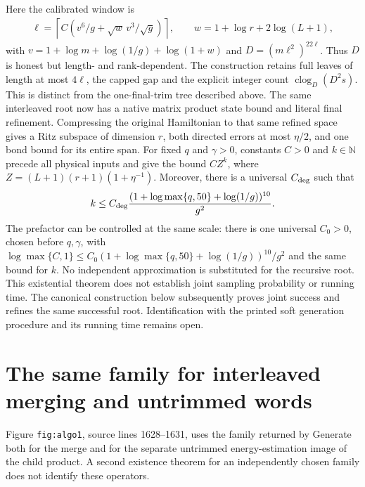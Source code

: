 \documentclass{article}
\begin{document}
Here the calibrated window is
\begin{align}
    \ell=\left\lceil C\left(v^6/g+\sqrt w\,v^3/\sqrt g\right)\right\rceil,
    \qquad w=1+\log r+2\log(L+1),
    \label{eq:alvv_approximation_calibrated_window}
\end{align}
with $v=1+\log m+\log(1/g)+\log(1+w)$ and
$D=(m\ell^2)^{22\ell}$. Thus $D$ is honest but length- and rank-dependent.
The construction retains full leaves of length at most $4\ell$, the capped
gap and the explicit integer count $\operatorname{clog}_D(D^2s)$.
This is distinct from the one-final-trim tree described above. The
same interleaved root now has a native matrix product state bound and
literal final refinement. Compressing the original Hamiltonian to that
same refined space gives a Ritz subspace of dimension $r$, both directed
errors at most $\eta/2$, and one bond bound for its entire span. For
fixed $q$ and $\gamma>0$, constants $C>0$ and $k\in\mathbb N$ precede
all physical inputs and give the bound $CZ^k$, where
$Z=(L+1)(r+1)(1+\eta^{-1})$. Moreover, there is a universal
$C_{\rm deg}$ such that
\begin{align}
    k\le C_{\rm deg}\frac{(1+\log\max\{q,50\}+\log(1/g))^{10}}{g^2}.
    \label{eq:alvv_approximation_degree_bound}
\end{align}
The prefactor can be controlled at the same scale: there is one
universal $C_0>0$, chosen before $q,\gamma$, with
$\log\max\{C,1\}\le C_0(1+\log\max\{q,50\}+\log(1/g))^{10}/g^2$
and the same bound for $k$.
No independent approximation is substituted for the recursive root.
This existential theorem does not establish joint sampling probability
or running time. The canonical construction below subsequently proves
joint success and refines the same successful root. Identification with
the printed soft generation procedure and its running time remains open.


\section{The same family for interleaved merging and untrimmed words}

Figure \texttt{fig:algo1}, source lines 1628--1631, uses the family
returned by Generate both for the merge and for the separate untrimmed
energy-estimation image of the child product. A second existence theorem
for an independently chosen family does not identify these operators.
\end{document}
